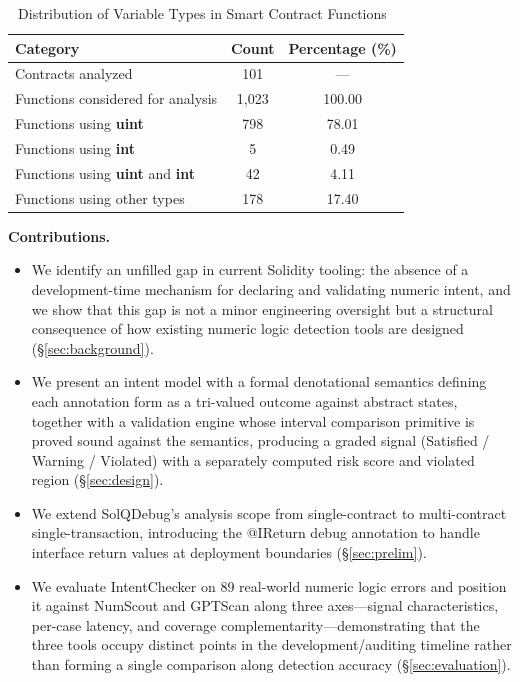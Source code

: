 \documentclass[pdflatex,sn-basic]{sn-jnl}%
\theoremstyle{thmstyleone}%
\theoremstyle{thmstyletwo}%
\theoremstyle{thmstylethree}%
\begin{document}
\begin{table}[!t]
    \centering
    \caption{Distribution of Variable Types in Smart Contract Functions~\citep{dappscananalysis}}
    \label{tab:variable_distribution}
    \small
    \begin{tabular*}{\columnwidth}{@{\extracolsep{\fill}}lcc}
        \hline
        \textbf{Category} & \textbf{Count} & \textbf{Percentage (\%)} \\
        \hline
        Contracts analyzed & 101 & --- \\
        Functions considered for analysis & 1{,}023 & 100.00 \\
        \hline
        Functions using \textbf{uint} & 798 & 78.01 \\
        Functions using \textbf{int} & 5 & 0.49 \\
        Functions using \textbf{uint} and \textbf{int} & 42 & 4.11 \\
        Functions using other types & 178 & 17.40 \\
        \hline
    \end{tabular*}
\end{table}

\smallskip
\noindent\textbf{Contributions.}
\begin{itemize}
    \item We identify an unfilled gap in current Solidity tooling: the absence of a development-time mechanism for declaring and validating numeric intent, and we show that this gap is not a minor engineering oversight but a structural consequence of how existing numeric logic detection tools are designed (§\ref{sec:background}).
    \item We present an intent model with a formal denotational semantics defining each annotation form as a tri-valued outcome against abstract states, together with a validation engine whose interval comparison primitive is proved sound against the semantics, producing a graded signal (Satisfied / Warning / Violated) with a separately computed risk score and violated region (§\ref{sec:design}).
    \item We extend SolQDebug's analysis scope from single-contract to multi-contract single-transaction, introducing the @IReturn debug annotation to handle interface return values at deployment boundaries (§\ref{sec:prelim}).
    \item We evaluate IntentChecker on 89 real-world numeric logic errors and position it against NumScout and GPTScan along three axes---signal characteristics, per-case latency, and coverage complementarity---demonstrating that the three tools occupy distinct points in the development/auditing timeline rather than forming a single comparison along detection accuracy (§\ref{sec:evaluation}).
\end{itemize}
\end{document}
